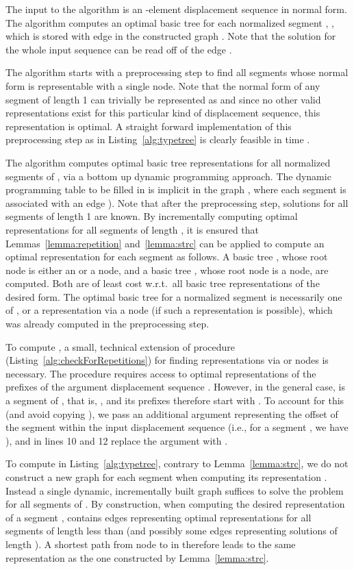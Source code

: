 \documentclass[a4paper,11pt]{article}
\newenvironment{proof}{\par\noindent{\textsc{Proof:}}\space}{\protect\\ \par}
\begin{document}
\begin{proof}
The input to the algorithm is an -element displacement sequence
 in normal form.  The algorithm computes an optimal basic
tree  for each normalized segment , , which is stored with edge  in the constructed graph
.  Note that the solution for the whole input sequence 
can be read off of the edge .

The algorithm starts with a preprocessing step to find all segments
whose normal form is representable with a single  node.  Note
that the normal form of any segment of length 1 can trivially be
represented as  and since no other valid representations
exist for this particular kind of displacement sequence, this
representation is optimal.  A straight forward implementation of this
preprocessing step as in Listing~\ref{alg:typetree} is clearly
feasible in time .

The algorithm computes optimal basic tree representations for all
normalized segments of , via a bottom up dynamic programming
approach.  The dynamic programming table to be filled in is implicit
in the graph , where each segment  is associated with
an edge ).  Note that after the preprocessing step,
solutions for all segments of length 1 are known.  By incrementally
computing optimal representations for all segments of length
, it is ensured that Lemmas~\ref{lemma:repetition}
and~\ref{lemma:strc} can be applied to compute an optimal
representation for each segment as follows.  A basic tree , whose
root node is either an  or a  node, and a basic tree
, whose root node is a  node, are computed.  Both are of
least cost w.r.t.\ all basic tree representations of the desired form.
The optimal basic tree for a normalized segment  is
necessarily one of ,  or a representation via a  node
(if such a representation is possible), which was already computed in
the preprocessing step.

To compute , a small, technical extension of procedure
 (Listing~\ref{alg:checkForRepetitions}) for finding
representations via  or  nodes is necessary.  The
procedure requires access to optimal representations of the prefixes
of the argument displacement sequence . However, in the general
case,  is a segment of , that is, , and
its prefixes therefore start with .  To account for this
(and avoid copying ), we pass an additional argument 
representing the offset of the segment within the input displacement
sequence  (i.e., for a segment , we have
), and in lines 10 and 12 replace the argument  with
.

To compute  in Listing~\ref{alg:typetree}, contrary to
Lemma~\ref{lemma:strc}, we do not construct a new graph for each
segment when computing its representation .  Instead a single
dynamic, incrementally built graph  suffices to solve the problem
for all segments of .  By construction, when computing the
desired representation of a segment ,  contains
edges representing optimal representations for all segments of length
less than  (and possibly some edges representing solutions of
length ).  A shortest path from node  to  in 
therefore leads to the same representation as the one constructed by
Lemma~\ref{lemma:strc}.


\end{proof}
\end{document}
